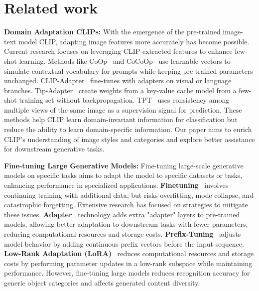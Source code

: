 \section{Related work}

\textbf{Domain Adaptation CLIPs:} With the emergence of the pre-trained image-text model CLIP, adapting image features more accurately has become possible. Current research focuses on leveraging CLIP-extracted features to enhance few-shot learning. Methods like CoOp~\cite{zhou2022learning} and CoCoOp~\cite{zhou2022conditional} use learnable vectors to simulate contextual vocabulary for prompts while keeping pre-trained parameters unchanged. CLIP-Adapter~\cite{gao2023clip} fine-tunes with adapters on visual or language branches. Tip-Adapter~\cite{zhang2021tip} create weights from a key-value cache model from a few-shot training set without backpropagation. TPT~\cite{shu2022test} uses consistency among multiple views of the same image as a supervision signal for prediction. These methods help CLIP learn domain-invariant information for classification but reduce the ability to learn domain-specific information. Our paper aims to enrich CLIP's understanding of image styles and categories and explore better assistance for downstream generative tasks.

\textbf{Fine-tuning Large Generative Models: }
Fine-tuning large-scale generative models on specific tasks aims to adapt the model to specific datasets or tasks, enhancing performance in specialized applications. \textbf{Finetuning}~\cite{kumar2022fine} involves continuing training with additional data, but risks overfitting, mode collapse, and catastrophic forgetting. Extensive research has focused on strategies to mitigate these issues. \textbf{Adapter}~\cite{chen2022vision} technology adds extra "adapter" layers to pre-trained models, allowing better adaptation to downstream tasks with fewer parameters, reducing computational resources and storage costs. \textbf{Prefix-Tuning}~\cite{li2021prefix} adjusts model behavior by adding continuous prefix vectors before the input sequence. \textbf{Low-Rank Adaptation (LoRA)}~\cite{hu2022lora} reduces computational resources and storage costs by performing parameter updates in a low-rank subspace while maintaining performance. However, fine-tuning large models reduces recognition accuracy for generic object categories and affects generated content diversity. 

